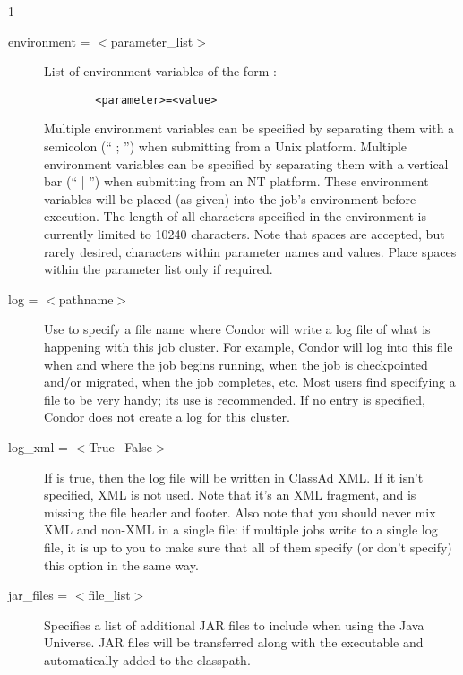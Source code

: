 \begin{ManPage}{\label{man-condor-submit}}{1}
\begin{description}
\item[environment = $<$parameter\_list$>$] List of environment variables
of the form :
\begin{verbatim}
        <parameter>=<value>
\end{verbatim}
Multiple environment variables can be specified by separating them with a
semicolon (`` ; '') when submitting from a Unix platform.
Multiple environment variables can be specified by separating them with a
vertical bar (`` | '') when submitting from an NT platform.
These environment variables will be placed (as given) into the
job's environment before execution. The length of all characters
specified in the environment is currently limited to 10240 characters.  
Note that spaces are accepted, but rarely desired,
characters within parameter names and values.
Place spaces within the parameter list only if required.


\item[log = $<$pathname$>$] Use  to specify a file name where
Condor will write a log file of what is happening with this job cluster.
For example, Condor will log into this file when and where the job
begins running, when the job is checkpointed and/or migrated, when the
job completes, etc. Most users find specifying a  file to be very
handy; its use is recommended. If no  entry is specified, 
Condor does not create a log for this cluster.

\item[log\_xml = $<$True \Bar\ False$>$] If  is true, 
then the log file will be written in ClassAd XML. If it isn't
specified, XML is not used. Note that it's an XML fragment, and is
missing the file header and footer. Also note that you should never
mix XML and non-XML in a single file: if multiple jobs write to a
single log file, it is up to you to make sure that all of them specify
(or don't specify) this option in the same way.


\item[jar\_files = $<$file\_list$>$]
Specifies a list of additional JAR files to include when using
the Java Universe.  JAR files will be transferred along with
the executable and automatically added to the classpath.



\end{description}
\end{ManPage}
